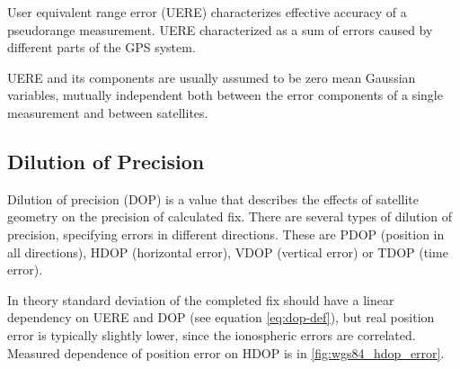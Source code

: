 
User equivalent range error (UERE) characterizes effective accuracy of a pseudorange measurement.
UERE characterized as a sum of errors caused by different parts of the GPS system.

UERE and its components are usually assumed to be zero mean Gaussian variables,
mutually independent both between the error components of a single measurement and between satellites.

\subsection{Dilution of Precision}
\label{sec:gps-dop}

Dilution of precision (DOP) is a value that describes the effects of satellite geometry
on the precision of calculated fix.
There are several types of dilution of precision, specifying errors in different directions.
These are PDOP (position in all directions), HDOP (horizontal error), VDOP (vertical error)
or TDOP (time error).

In theory standard deviation of the completed fix should have a linear dependency on
UERE and DOP (see equation \eqref{eq:dop-def}), but real position error is typically slightly lower,
since the ionospheric errors are correlated.
Measured dependence of position error on HDOP is in \autoref{fig:wgs84_hdop_error}.


